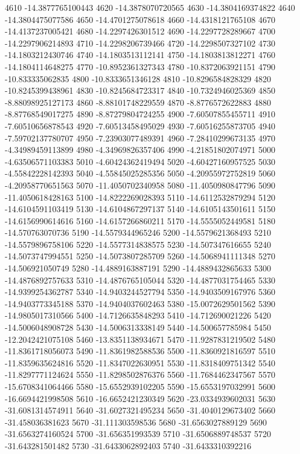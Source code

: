 {4610 -14.3877765100443
4620 -14.3878070720565
4630 -14.3804169374822
4640 -14.3804475077586
4650 -14.4701275078618
4660 -14.4318121765108
4670 -14.4137237005421
4680 -14.2297426301512
4690 -14.2297728289667
4700 -14.2297906214893
4710 -14.2298206739466
4720 -14.2298507327102
4730 -14.1803212430746
4740 -14.1803513112141
4750 -14.1803813812271
4760 -14.1804114648275
4770 -10.8952361327343
4780 -10.8372063921151
4790 -10.833335062835
4800 -10.8333651346128
4810 -10.8296584828329
4820 -10.8245399438961
4830 -10.8245684723317
4840 -10.7324946025369
4850 -8.88098925127173
4860 -8.88101748229559
4870 -8.8776572622883
4880 -8.87768549017275
4890 -8.87279804724255
4900 -7.60507855455711
4910 -7.60510656878543
4920 -7.60513458495029
4930 -7.60516255873705
4940 -7.59702137780707
4950 -7.23903077489391
4960 -7.28410299673135
4970 -4.34989459113899
4980 -4.34969826357406
4990 -4.21851802074971
5000 -4.63506571103383
5010 -4.60424362419494
5020 -4.60427160957525
5030 -4.55842228142393
5040 -4.55845025285356
5050 -4.20955972752819
5060 -4.20958770651563
5070 -11.4050702340958
5080 -11.4050980847796
5090 -11.4050618428163
5100 -14.8222269028393
5110 -14.6112532879294
5120 -14.6104591103419
5130 -14.6104867297137
5140 -14.6105143501611
5150 -14.6156990614616
5160 -14.6157266860211
5170 -14.5555052449581
5180 -14.570763070736
5190 -14.5579344965246
5200 -14.5579621368493
5210 -14.5579896758106
5220 -14.5577314838575
5230 -14.507347616655
5240 -14.5073747994551
5250 -14.5073807285709
5260 -14.5068941111348
5270 -14.506921050749
5280 -14.4889163887191
5290 -14.4889432865633
5300 -14.4876892757633
5310 -14.4876765105044
5320 -14.4877031754465
5330 -14.9399254362787
5340 -14.9403244527794
5350 -14.9403509167976
5360 -14.9403773345188
5370 -14.9404037602463
5380 -15.0072629501562
5390 -14.9805017310566
5400 -14.7126635848293
5410 -14.712690021226
5420 -14.5006048908728
5430 -14.5006313338149
5440 -14.500657785984
5450 -12.2042421075108
5460 -13.8351138934671
5470 -11.9287831219502
5480 -11.8361718056073
5490 -11.8361982588536
5500 -11.8360921816597
5510 -11.8359635624816
5520 -11.8347022630951
5530 -11.8318409751342
5540 -11.8297771124624
5550 -11.8298502876376
5560 -11.7684462347567
5570 -15.6708341064466
5580 -15.6552939102205
5590 -15.6553197032991
5600 -16.6694421998508
5610 -16.6652421230349
5620 -23.0334939602031
5630 -31.6081314574911
5640 -31.6027321495234
5650 -31.4040129673402
5660 -31.458036381623
5670 -31.111303598536
5680 -31.6563027889129
5690 -31.6563274160524
5700 -31.656351993539
5710 -31.6506889748537
5720 -31.643281501482
5730 -31.6433062892403
5740 -31.6433310392216
}
